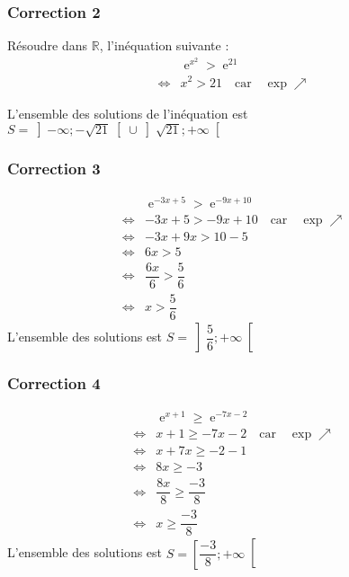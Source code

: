 \documentclass[15pt, mathserif]{beamer}
\DeclareMathOperator{\e}{e}
\newcommand{\R}{\mathbb{R}}			%
\begin{document}
\begin{frame}
\vspace{-10mm}
	\frametitle{Correction 2}
 \begin{multicols}{2} 
 \bigskip 
 Résoudre dans $\R$, l'inéquation suivante : \begin{align*} 
 & \e^{x^2}> \e^{21} \\ \Leftrightarrow & x^2>21\quad \text{car} \quad \exp \nearrow 
 \end{align*} 
 
 \bigskip 
 
 L'ensemble des solutions de l'inéquation est $S=\left]-\infty;-\sqrt{21}\right[ \cup \left]\sqrt{21};+\infty\right[$
 
 \end{multicols} 
 \end{frame}


\begin{frame}
\vspace{-10mm}
	\frametitle{Correction 3}
\begin{align*} 
 & \e^{-3x+5}> \e^{-9x+10} \\ 
 \Leftrightarrow & -3x+5> -9x+10 \quad \text{car} \quad \exp \nearrow \\ 
 \Leftrightarrow & -3x+9x > 10-5\\ 
 \Leftrightarrow & 6x > 5\\ 
 \Leftrightarrow &\dfrac{6x}{6}> \dfrac{5}{6} \\ 
 \Leftrightarrow & x > \dfrac{5}{6} 
 \end{align*} 
 L'ensemble des solutions est $S=\left]\dfrac{5}{6};+\infty\right[$\end{frame}


\begin{frame}
\vspace{-10mm}
	\frametitle{Correction 4}
\begin{align*} 
 & \e^{x+1} \geqslant \e^{-7x-2} \\ 
 \Leftrightarrow & x+1\geqslant  -7x-2 \quad \text{car} \quad \exp \nearrow\\ 
 \Leftrightarrow & x+7x \geqslant  -2-1\\ 
 \Leftrightarrow & 8x \geqslant  -3\\ 
 \Leftrightarrow &\dfrac{8x}{8}\geqslant  \dfrac{-3}{8} \\ 
 \Leftrightarrow & x \geqslant \dfrac{-3}{8} 
 \end{align*} 
 L'ensemble des solutions est $S=\left[\dfrac{-3}{8};+\infty\right[$\end{frame}
\end{document}
